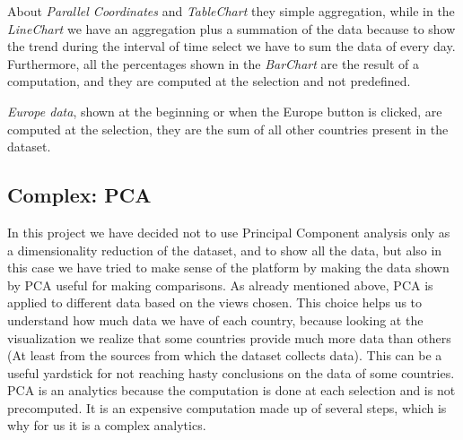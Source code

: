 \documentclass[10pt,conference]{IEEEtran}
\begin{document}
About {\em Parallel Coordinates} and {\em TableChart} they simple aggregation, while in the {\em LineChart} we have an aggregation plus a summation of the data because to show the trend during the interval of time select we have to sum the data of every day. Furthermore, all the percentages shown in the {\em BarChart} are the result of a computation, and they are computed at the selection and not predefined.

{\em Europe data}, shown at the beginning or when the Europe button is clicked, are computed at the selection, they are the sum of all other countries present in the dataset.

\subsection{Complex: PCA}
In this project we have decided not to use Principal Component analysis only as a dimensionality reduction of the dataset, and to show all the data, but also in this case we have tried to make sense of the platform by making the data shown by PCA useful for making comparisons. As already mentioned above, PCA is applied to different data based on the views chosen. This choice helps us to understand how much data we have of each country, because looking at the visualization we realize that some countries provide much more data than others (At least from the sources from which the dataset collects data). This can be a useful yardstick for not reaching hasty conclusions on the data of some countries. PCA is an analytics because the computation is done at each selection and is not precomputed. It is an expensive computation made up of several steps, which is why for us it is a complex analytics.


\begin{figure}[!t]
\end{figure}
	
\end{document}
